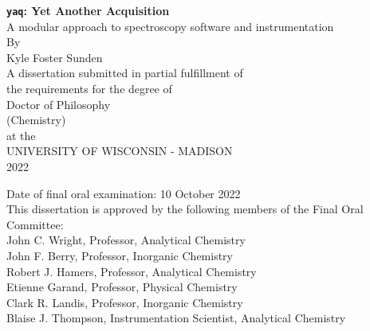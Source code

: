 \documentclass{dissertation}
\begin{document}
\raggedbottom


\begin{centering}
\thispagestyle{empty}


\textbf{\texttt{yaq}: Yet Another Acquisition} \\
A modular approach to spectroscopy software and instrumentation \\
\vspace{80 pt}
By \\
Kyle Foster Sunden \\
\vspace{40 pt}
A dissertation submitted in partial fulfillment of \\
the requirements for the degree of \\
\vspace{10 pt}
Doctor of Philosophy \\ (Chemistry) \\
\vspace{40 pt}
at the \\
UNIVERSITY OF WISCONSIN - MADISON \\
2022 \\
\end{centering}

\vfill

\noindent Date of final oral examination: 10 October 2022 \\
This dissertation is approved by the following members of the Final Oral Committee: \\
\-\hspace{1cm} John C. Wright, Professor, Analytical Chemistry \\
\-\hspace{1cm} John F. Berry, Professor, Inorganic Chemistry \\
\-\hspace{1cm} Robert J. Hamers, Professor, Analytical Chemistry \\
\-\hspace{1cm} Etienne Garand, Professor, Physical Chemistry \\
\-\hspace{1cm} Clark R. Landis, Professor, Inorganic Chemistry \\
\-\hspace{1cm} Blaise J. Thompson, Instrumentation Scientist, Analytical Chemistry \\
\end{document}
